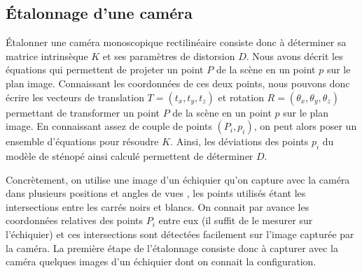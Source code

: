 \subsection{Étalonnage d'une caméra}
\label{subsec:pinhole_camera_calibration}
Étalonner une caméra monoscopique rectilinéaire consiste donc à déterminer sa matrice intrinsèque $K$ et ses paramètres de distorsion $D$. Nous avons décrit les équations qui permettent de projeter un point $P$ de la scène en un point $p$ sur le plan image. Connaissant les coordonnées de ces deux points, nous pouvons donc écrire les vecteurs de translation $T = (t_x, t_y, t_z)$ et rotation $R = (\theta_x, \theta_y, \theta_z)$ permettant de transformer un point $P$ de la scène en un point $p$ sur le plan image. En connaissant assez de couple de points $(P_i, p_i)$, on peut alors poser un ensemble d'équations pour résoudre $K$. Ainsi, les déviations des points $p_i$ du modèle de sténopé ainsi calculé permettent de déterminer $D$.


Concrètement, on utilise une image d'un échiquier qu'on capture avec la caméra dans plusieurs positions et angles de vues , les points utilisés étant les intersections entre les carrés noirs et blancs. On connait par avance les coordonnées relatives des points $P_i$ entre eux (il suffit de le mesurer sur l'échiquier) et ces intersections sont détectées facilement sur l'image capturée par la caméra. La première étape de l'étalonnage consiste donc à capturer avec la caméra quelques images d'un échiquier dont on connait la configuration.


